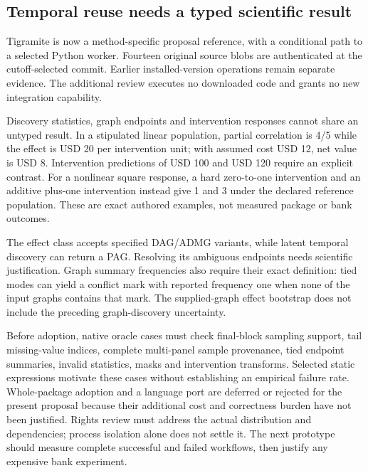 \hypertarget{temporal-reuse-needs-a-typed-scientific-result}{%
\subsection{Temporal reuse needs a typed scientific
result}\label{temporal-reuse-needs-a-typed-scientific-result}}

Tigramite is now a method-specific proposal reference, with a
conditional path to a selected Python worker. Fourteen original source
blobs are authenticated at the cutoff-selected commit. Earlier
installed-version operations remain separate evidence. The additional
review executes no downloaded code and grants no new integration
capability. \citep{exec23_tigramite_reuse_source,sp23tg_reader}

Discovery statistics, graph endpoints and intervention responses cannot
share an untyped result. In a stipulated linear population, partial
correlation is 4/5 while the effect is USD 20 per intervention unit;
with assumed cost USD 12, net value is USD 8. Intervention predictions
of USD 100 and USD 120 require an explicit contrast. For a nonlinear
square response, a hard zero-to-one intervention and an additive
plus-one intervention instead give 1 and 3 under the declared reference
population. These are exact authored examples, not measured package or
bank outcomes. \citep{exec23_tigramite_reference}

The effect class accepts specified DAG/ADMG variants, while latent
temporal discovery can return a PAG. Resolving its ambiguous endpoints
needs scientific justification. Graph summary frequencies also require
their exact definition: tied modes can yield a conflict mark with
reported frequency one when none of the input graphs contains that mark.
The supplied-graph effect bootstrap does not include the preceding
graph-discovery uncertainty. \citep{exec23_tigramite_reuse_source}

Before adoption, native oracle cases must check final-block sampling
support, tail missing-value indices, complete multi-panel sample
provenance, tied endpoint summaries, invalid statistics, masks and
intervention transforms. Selected static expressions motivate these
cases without establishing an empirical failure rate. Whole-package
adoption and a language port are deferred or rejected for the present
proposal because their additional cost and correctness burden have not
been justified. Rights review must address the actual distribution and
dependencies; process isolation alone does not settle it. The next
prototype should measure complete successful and failed workflows, then
justify any expensive bank experiment.
\citep{exec23_tigramite_reuse_source,sp23tg_progress}

